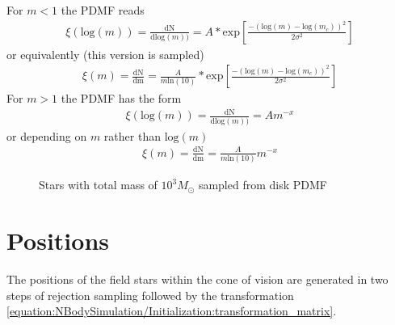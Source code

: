 \documentclass[letterpaper,10pt,english]{sphinxmanual}
\begin{document}
\sphinxAtStartPar
For \(m<1\) the PDMF reads
\begin{equation}\label{equation:NBodySimulation/Initialization:lognormal}
\begin{split}\xi\left(\mathrm{log}(m)\right) = \frac{\mathrm{dN}}{\mathrm{dlog}(m))} = A*\mathrm{exp}[ \frac{-( \mathrm{log}(m) -\mathrm{log}( m_{c} ))^{2} }{2 \sigma^{2}}]\end{split}
\end{equation}
\sphinxAtStartPar
or equivalently (this version is sampled)
\begin{equation*}
\begin{split}\xi\left(m\right) = \frac{\mathrm{dN}}{\mathrm{dm}} = \frac{A}{m\mathrm{ln}(10)}*\mathrm{exp}[ \frac{-( \mathrm{log}(m) -\mathrm{log}( m_{c} ))^{2} }{2 \sigma^{2}}]\end{split}
\end{equation*}
\sphinxAtStartPar
For \(m>1\) the PDMF has the form
\begin{equation*}
\begin{split}\xi\left(\mathrm{log}(m)\right) = \frac{\mathrm{dN}}{\mathrm{dlog}(m))} = A m^{-x}\end{split}
\end{equation*}
\sphinxAtStartPar
or depending on \(m\) rather than \(\mathrm{log}(m)\)
\begin{equation*}
\begin{split}\xi\left(m\right) = \frac{\mathrm{dN}}{\mathrm{dm}} = \frac{A}{m\mathrm{ln}(10)} m^{-x}\end{split}
\end{equation*}
\begin{figure}[htbp]
\centering
\capstart

\noindent{}
\caption{Stars with total mass of \(10^3 M_{\odot}\) sampled from disk PDMF}\label{\detokenize{NBodySimulation/Initialization:id44}}\label{\detokenize{NBodySimulation/Initialization:fig-initial-conditions-mass-disk}}\end{figure}


\section{Positions}
\label{\detokenize{NBodySimulation/Initialization:positions}}
\sphinxAtStartPar
The positions of the field stars within the cone of vision are generated in two steps of rejection sampling followed by the transformation \eqref{equation:NBodySimulation/Initialization:transformation_matrix}.
\end{document}
